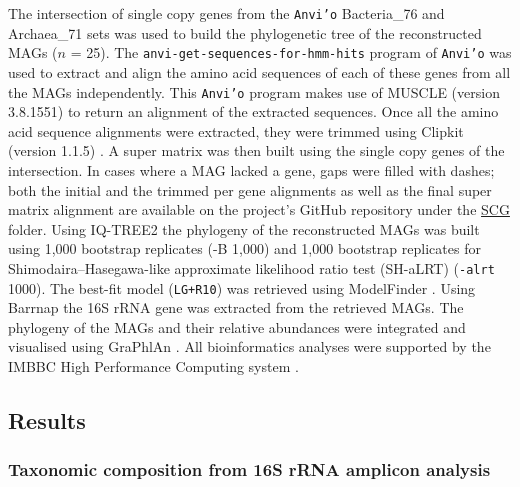    The intersection of single copy genes from the \texttt{Anvi’o} \citep{eren_anvio_2015} Bacteria\_76 and Archaea\_71 sets was used to build the phylogenetic tree of the reconstructed MAGs ($n$ = 25). 
   The \texttt{anvi-get-sequences-for-hmm-hits} program of \texttt{Anvi’o} was used to extract and align the amino acid sequences of each of these genes from all the MAGs independently. 
   This \texttt{Anvi’o} program makes use of MUSCLE (version 3.8.1551) \citep{edgar_muscle_2004} to return an alignment of the extracted sequences. 
   Once all the amino acid sequence alignments were extracted, they were trimmed using Clipkit (version 1.1.5) \citep{steenwyk_clipkit_2020}. 
   A super matrix was then built using the single copy genes of the intersection. 
   In cases where a MAG lacked a gene, gaps were filled with dashes; both the initial and the trimmed per gene alignments as well as the final super matrix alignment are available on the project’s GitHub repository 
   under the \href{https://github.com/hariszaf/karpathos-swamp/tree/main/phylogeny/SCG/}{SCG} folder. 
   Using IQ-TREE2 \citep{hoang_ufboot2_2018, minh_iq-tree_2020} the phylogeny of the reconstructed MAGs was built using 1,000 bootstrap replicates (-B 1,000) and 1,000 bootstrap replicates for Shimodaira–Hasegawa-like 
   approximate likelihood ratio test (SH-aLRT) (\texttt{-alrt} 1000). 
   The best-fit model (\texttt{LG+R10}) was retrieved using ModelFinder \citep{kalyaanamoorthy_modelfinder_2017}. 
   Using Barrnap \citep{seemann_barrnap_2014} the 16S rRNA gene was extracted from the retrieved MAGs. 
   The phylogeny of the MAGs and their relative abundances were integrated and visualised using GraPhlAn \citep{asnicar_compact_2015}. 
   All bioinformatics analyses were supported by the IMBBC High Performance Computing system \citep{zafeiropoulos_imbbc_2021}.

\subsection{Results}
\label{swamp:results}


\subsubsection*{Taxonomic composition from 16S rRNA amplicon analysis}

